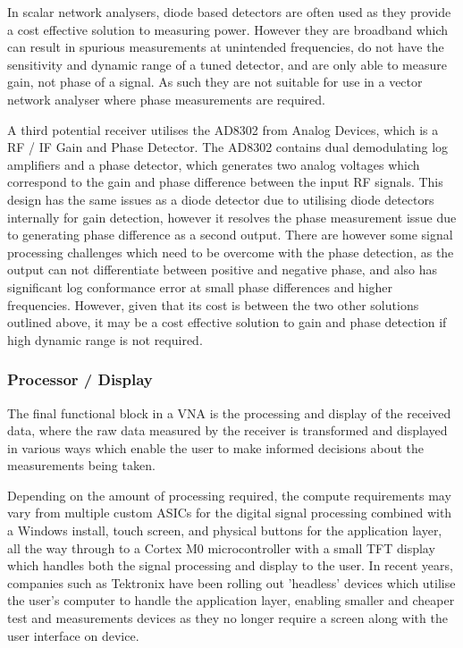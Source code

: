 In scalar network analysers, diode based detectors are often used as they provide a cost effective solution to measuring power. However they are broadband which can result in spurious measurements at unintended frequencies, do not have the sensitivity and dynamic range of a tuned detector, and are only able to measure gain, not phase of a signal. As such they are not suitable for use in a vector network analyser where phase measurements are required.

A third potential receiver utilises the AD8302 from Analog Devices, which is a RF / IF Gain and Phase Detector.\cite{ad8302_datasheet} The AD8302 contains dual demodulating log amplifiers and a phase detector, which generates two analog  voltages which correspond to the gain and phase difference between the input RF signals. This design has the same issues as a diode detector due to utilising diode detectors internally for gain detection, however it resolves the phase measurement issue due to generating phase difference as a second output. There are however some signal processing challenges which need to be overcome with the phase detection, as the output can not differentiate between positive and negative phase, and also has significant log conformance error at small phase differences and higher frequencies. However, given that its cost is between the two other solutions outlined above, it may be a cost effective solution to gain and phase detection if high dynamic range is not required. 

\subsubsection{Processor / Display}
\label{subsubsec:processor display}
The final functional block in a VNA is the processing and display of the received data, where the raw data measured by the receiver is transformed and displayed in various ways which enable the user to make informed decisions about the measurements being taken. 

Depending on the amount of processing required, the compute requirements may vary from multiple custom ASICs for the digital signal processing combined with a Windows install, touch screen, and physical buttons for the application layer, all the way through to a Cortex M0 microcontroller with a small TFT display which handles both the signal processing and display to the user. In recent years, companies such as Tektronix have been rolling out 'headless' devices which utilise the user's computer to handle the application layer, enabling smaller and cheaper test and measurements devices as they no longer require a screen along with the user interface on device. 

